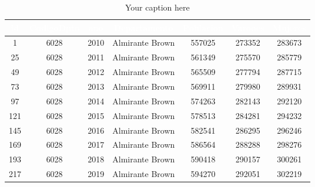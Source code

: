 \begin{table}[htb]
\centering
\begin{tabular}{|c|c|c|c|c|c|c|}
\hline
\textbf{\cellcolor[rgb]{0,0.231,0.427}\textcolor{white}{id}} & \textbf{\cellcolor[rgb]{0,0.231,0.427}\textcolor{white}{CodigoDpto}} & \textbf{\cellcolor[rgb]{0,0.231,0.427}\textcolor{white}{ano}} & \textbf{\cellcolor[rgb]{0,0.231,0.427}\textcolor{white}{Departamento}} & \textbf{\cellcolor[rgb]{0,0.231,0.427}\textcolor{white}{Poblacion}} & \textbf{\cellcolor[rgb]{0,0.231,0.427}\textcolor{white}{Varones}} & \textbf{\cellcolor[rgb]{0,0.231,0.427}\textcolor{white}{Mujeres}} \\ \hline
1 & 6028 & 2010 & Almirante Brown & 557025 & 273352 & 283673 \\
25 & 6028 & 2011 & Almirante Brown & 561349 & 275570 & 285779 \\
49 & 6028 & 2012 & Almirante Brown & 565509 & 277794 & 287715 \\
73 & 6028 & 2013 & Almirante Brown & 569911 & 279980 & 289931 \\
97 & 6028 & 2014 & Almirante Brown & 574263 & 282143 & 292120 \\
121 & 6028 & 2015 & Almirante Brown & 578513 & 284281 & 294232 \\
145 & 6028 & 2016 & Almirante Brown & 582541 & 286295 & 296246 \\
169 & 6028 & 2017 & Almirante Brown & 586564 & 288288 & 298276 \\
193 & 6028 & 2018 & Almirante Brown & 590418 & 290157 & 300261 \\
217 & 6028 & 2019 & Almirante Brown & 594270 & 292051 & 302219 \\
\hline
\end{tabular}
\caption{Your caption here}
\label{tab:my_table}
\end{table}
